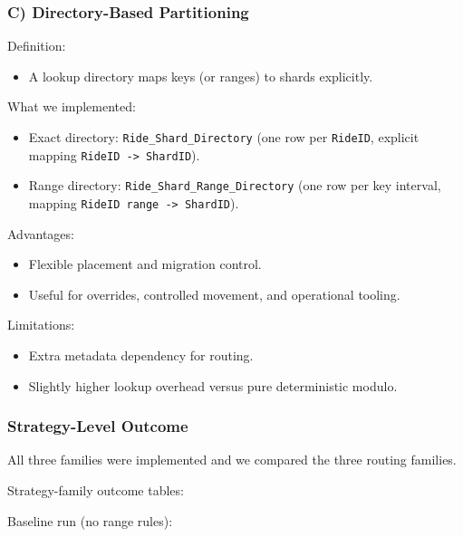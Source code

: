 \documentclass[12pt]{article}
\begin{document}
\subsubsection*{C) Directory-Based Partitioning}

Definition:
\begin{itemize}
    \item A lookup directory maps keys (or ranges) to shards explicitly.
\end{itemize}

What we implemented:
\begin{itemize}
    \item Exact directory: \texttt{Ride\_Shard\_Directory} (one row per \texttt{RideID}, explicit mapping \texttt{RideID -> ShardID}).
    \item Range directory: \texttt{Ride\_Shard\_Range\_Directory} (one row per key interval, mapping \texttt{RideID range -> ShardID}).
\end{itemize}

Advantages:
\begin{itemize}
    \item Flexible placement and migration control.
    \item Useful for overrides, controlled movement, and operational tooling.
\end{itemize}

Limitations:
\begin{itemize}
    \item Extra metadata dependency for routing.
    \item Slightly higher lookup overhead versus pure deterministic modulo.
\end{itemize}

\subsubsection*{Strategy-Level Outcome}

All three families were implemented and we compared the three routing families.

Strategy-family outcome tables:

Baseline run (no range rules):

\begin{table}[H]
\centering
\begin{minipage}{\textwidth}
\centering
{}
\end{minipage}
\end{table}
\end{document}
